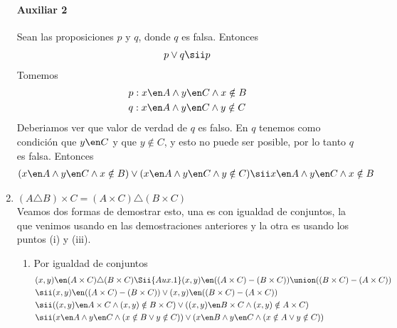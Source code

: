 \begin{enumerate}[label=\roman*)]
        \paragraph{Auxiliar 2}{
          Sean las proposiciones $p$ y $q$, donde $q$ es falsa. Entonces
          \begin{align*}
            p \lor q \sii p
          \end{align*}
          Tomemos
          \begin{align*}
             & p: x \en A \land y \en C \land x \notin B \\
             & q: x \en A \land y \en C \land y \notin C
          \end{align*}
          Deberiamos ver que valor de verdad de $q$ es falso. En $q$ tenemos como condición que $y \en C$ y que $y \notin C$,
          y esto no puede ser posible, por lo tanto $q$ es falsa. Entonces
          \begin{align*}
            (x \en A \land y \en C \land x \notin B) \lor (x \en A \land y \en C \land y \notin C)
            \sii x \en A \land y \en C \land x \notin B
          \end{align*}
        }
  \item $(A \triangle B) \times C = (A \times C) \triangle (B \times C)$ \\
        Veamos dos formas de demostrar esto, una es con igualdad de conjuntos, la que venimos usando en las demostraciones
        anteriores y la otra es usando los puntos (i) y (iii).
        \begin{enumerate}
          \item Por igualdad de conjuntos
                \begin{align*}
                                         & (x,y) \en (A \times C) \triangle (B \times C)
                  \Sii{Aux.1} (x,y) \en ((A \times C) - (B \times C)) \union ((B \times C) - (A \times C))                  \\
                                         & \sii (x,y) \en ((A \times C) - (B \times C)) \lor (x,y) \en ((B \times C) - (A \times C))   \\
                                         & \sii ((x,y) \en A \times C \land (x,y) \notin B \times C)
                  \lor ((x,y) \en B \times C \land (x,y) \notin A \times C)                                                            \\
                                         & \sii (x \en A \land y \en C \land (x \notin B \lor y \notin C))
                  \lor (x \en B \land y \en C \land (x \notin A \lor y \notin C))                                                      \\

\end{align*}
\end{enumerate}
\end{enumerate}
